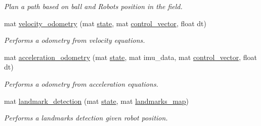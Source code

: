 \begin{DoxyCompactItemize}
\begin{DoxyCompactList}\small\item\em Plan a path based on ball and Robots position in the field. \end{DoxyCompactList}\item 
mat \hyperlink{class_robot_navigation_a50667808e539f4b632af5f60628cc228}{velocity\+\_\+odometry} (mat \hyperlink{class_robot_navigation_a93eb7dd2877e1f72f5741fb396adea81}{state}, mat \hyperlink{class_robot_navigation_a73838ceedac8376f3c333fcbfcd4a364}{control\+\_\+vector}, float dt)
\begin{DoxyCompactList}\small\item\em Performs a odometry from velocity equations. \end{DoxyCompactList}\item 
mat \hyperlink{class_robot_navigation_a0ca549632dc878d276ab2da06e5ed41b}{acceleration\+\_\+odometry} (mat \hyperlink{class_robot_navigation_a93eb7dd2877e1f72f5741fb396adea81}{state}, mat imu\+\_\+data, mat \hyperlink{class_robot_navigation_a73838ceedac8376f3c333fcbfcd4a364}{control\+\_\+vector}, float dt)
\begin{DoxyCompactList}\small\item\em Performs a odometry from acceleration equations. \end{DoxyCompactList}\item 
mat \hyperlink{class_robot_navigation_a94927041a7f2f2bc9c45803a84d5a9d6}{landmark\+\_\+detection} (mat \hyperlink{class_robot_navigation_a93eb7dd2877e1f72f5741fb396adea81}{state}, mat \hyperlink{class_robot_navigation_a1efd2001bd7cd70cc80d1c05b1c97988}{landmarks\+\_\+map})
\begin{DoxyCompactList}\small\item\em Performs a landmarks detection given robot position. \end{DoxyCompactList}\end{DoxyCompactItemize}
